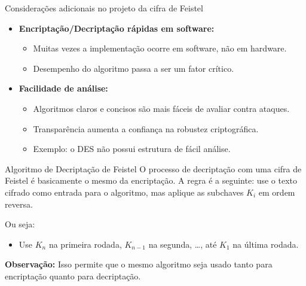 \begin{frame}{Considerações adicionais no projeto da cifra de Feistel}
\begin{itemize}
    \item \textbf{Encriptação/Decriptação rápidas em software:}  
    \begin{itemize}
        \item Muitas vezes a implementação ocorre em software, não em hardware.  
        \item Desempenho do algoritmo passa a ser um fator crítico.  
    \end{itemize}

    \item \textbf{Facilidade de análise:}  
    \begin{itemize}
        \item Algoritmos claros e concisos são mais fáceis de avaliar contra ataques.  
        \item Transparência aumenta a confiança na robustez criptográfica.  
        \item Exemplo: o DES não possui estrutura de fácil análise.  
    \end{itemize}
\end{itemize}
\end{frame}
\begin{frame}{Algoritmo de Decriptação de Feistel}
    O processo de decriptação com uma cifra de Feistel é basicamente o mesmo da encriptação.  
    A regra é a seguinte: use o texto cifrado como entrada para o algoritmo, mas aplique as subchaves \(K_i\) em ordem reversa.  

    \vspace{0.5cm}
    Ou seja: 
    \begin{itemize}
        \item Use \(K_n\) na primeira rodada, \(K_{n-1}\) na segunda, \dots, até \(K_1\) na última rodada.
    \end{itemize}

    \vspace{0.3cm}
    \textbf{Observação:} Isso permite que o mesmo algoritmo seja usado tanto para encriptação quanto para decriptação.
\end{frame}

